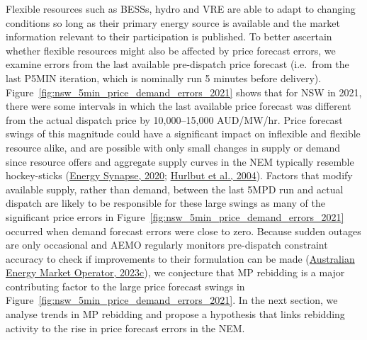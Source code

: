 \documentclass[12pt,a4paper,]{report}
\begin{document}
Flexible resources such as BESSs, hydro and VRE are able to adapt to
changing conditions so long as their primary energy source is available
and the market information relevant to their participation is published.
To better ascertain whether flexible resources might also be affected by
price forecast errors, we examine errors from the last available
pre-dispatch price forecast (i.e.~from the last P5MIN iteration, which
is nominally run 5 minutes before delivery).
Figure~\ref{fig:nsw_5min_price_demand_errors_2021} shows that for NSW in
2021, there were some intervals in which the last available price
forecast was different from the actual dispatch price by 10,000--15,000
AUD/MW/hr. Price forecast swings of this magnitude could have a
significant impact on inflexible and flexible resource alike, and are
possible with only small changes in supply or demand since resource
offers and aggregate supply curves in the NEM typically resemble
hockey-sticks
(\protect\hyperlink{ref-energysynapseDemandResponseNational2020}{Energy
Synapse, 2020};
\protect\hyperlink{ref-hurlbutProtectingMarketHockey2004}{Hurlbut et
al., 2004}). Factors that modify available supply, rather than demand,
between the last 5MPD run and actual dispatch are likely to be
responsible for these large swings as many of the significant price
errors in Figure~\ref{fig:nsw_5min_price_demand_errors_2021} occurred
when demand forecast errors were close to zero. Because sudden outages
are only occasional and AEMO regularly monitors pre-dispatch constraint
accuracy to check if improvements to their formulation can be made
(\protect\hyperlink{ref-australianenergymarketoperatorMonthlyConstraintReport2023}{Australian
Energy Market Operator, 2023c}), we conjecture that MP rebidding is a
major contributing factor to the large price forecast swings in
Figure~\ref{fig:nsw_5min_price_demand_errors_2021}. In the next section,
we analyse trends in MP rebidding and propose a hypothesis that links
rebidding activity to the rise in price forecast errors in the NEM.
\end{document}
